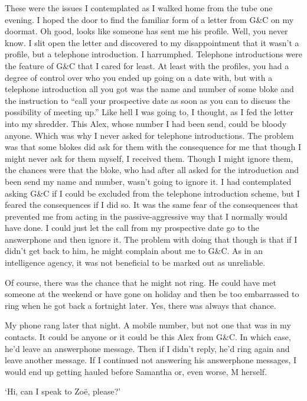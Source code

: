 These were the issues I contemplated as I walked home from the tube
one evening. I hoped the door to find the familiar form of a letter
from G{\&}C on my doormat. Oh good, looks like someone has sent me
his profile. Well, you never know. I slit open the letter and
discovered to my disappointment that it wasn't a profile, but a
telephone introduction. I harrumphed. Telephone introductions were
the feature of G{\&}C that I cared for least. At least with the
profiles, you had a degree of control over who you ended up going on
a date with, but with a telephone introduction all you got was the
name and number of some bloke and the instruction to ``call your
prospective date as soon as you can to discuss the possibility of
meeting up.'' Like hell I was going to, I thought, as I fed the
letter into my shredder. This Alex, whose number I had been send,
could be bloody anyone. Which was why I never asked for telephone
introductions. The problem was that some blokes did ask for them
with the consequence for me that though I might never ask for them
myself, I received them. Though I might ignore them, the chances
were that the bloke, who had after all asked for the introduction
and been send my name and number, wasn't going to ignore it. I had
contemplated asking G{\&}C if I could be excluded from the telephone
introduction scheme, but I feared the consequences if I did so. It
was the same fear of the consequences that prevented me from acting
in the passive-aggressive way that I normally would have done. I
could just let the call from my prospective date go to the
answerphone and then ignore it. The problem with doing that though
is that if I didn't get back to him, he might complain about me to
G{\&}C. As in an intelligence agency, it was not beneficial to be
marked out as unreliable.

Of course, there was the chance that he might not ring. He could
have met someone at the weekend or have gone on holiday and then be
too embarrassed to ring when he got back a fortnight later. Yes,
there was always that chance.

My phone rang later that night. A mobile number, but not one that
was in my contacts. It could be anyone or it could be this Alex from G{\&}C. In which case, he'd leave an answerphone message. Then if I didn't reply, he'd ring again and leave another message. If I continued not answering his answerphone messages, I would end up getting hauled before Samantha or, even worse, M herself.

`Hi, can I speak to Zoë, please?'

